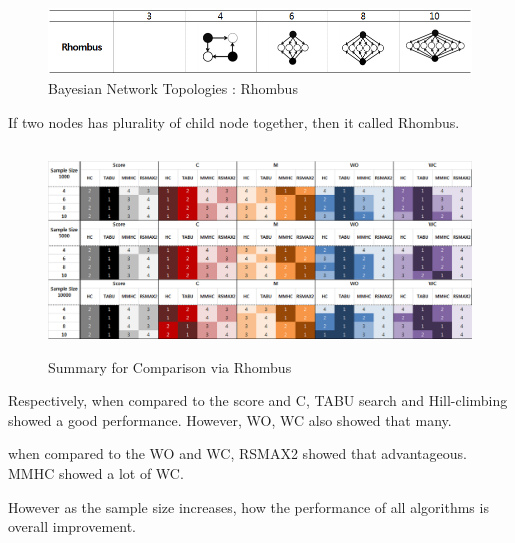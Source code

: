 	\begin{figure}[h]
	\centering
		\includegraphics[height=50pt]{Topologies_Rhombus}
		\caption{Bayesian Network Topologies : Rhombus}
	\end{figure}	

	If two nodes has plurality of child node together, then it called Rhombus.

\begin{figure}[!bhp]
	\centering
		\includegraphics[height=155pt]{Result_Rhombus}
		\caption{Summary for Comparison via Rhombus}
	\end{figure}	

Respectively, when compared to the score and C,  TABU search and Hill-climbing showed a good performance. However, WO, WC also showed that many.

when compared to the WO and WC, RSMAX2 showed that advantageous. MMHC showed a lot of WC.

However as the sample size increases, how the performance of all algorithms is overall improvement.
	
